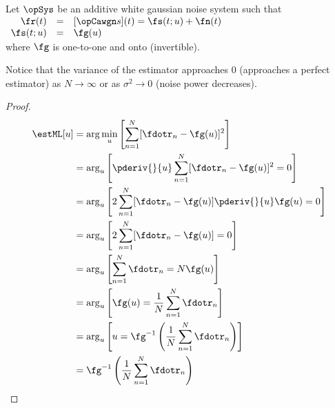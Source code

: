 {%
\begin{theorem}
\label{thm:estML-CR}
Let $\opSys$ be an additive white gaussian noise system
such that
$\begin{array}[t]{rcl}
   \fr(t)     &=& [\opCawgn s](t) = \fs(t;u) + \fn(t) \\
   \fs(t;u)   &=& \fg( u )
\end{array}$\\
where $\fg$ is one-to-one and onto (invertible).
\\
\end{theorem}

Notice that the variance of the estimator approaches $0$
(approaches a perfect estimator) as $N\to\infty$
or as $\sigma^2\to 0$ (noise power decreases).


\begin{proof}
\begin{align*}
   \estML[u]
     &= \arg\min_u
         \left[ \sum_{n=1}^N [\fdotr_n-\fg( u )]^2 \right]
   \\&= \arg_u\left[
            \pderiv{}{ u }\sum_{n=1}^N [\fdotr_n-\fg( u )]^2 = 0
         \right]
   \\&= \arg_u\left[
             2\sum_{n=1}^N [\fdotr_n-\fg( u )]\pderiv{}{ u }\fg( u ) = 0
         \right]
   \\&= \arg_u\left[
             2\sum_{n=1}^N [\fdotr_n-\fg( u )] = 0
         \right]
   \\&= \arg_u\left[
             \sum_{n=1}^N \fdotr_n = N \fg( u )
         \right]
   \\&= \arg_u\left[
             \fg( u ) = \frac{1}{N}\sum_{n=1}^N \fdotr_n
         \right]
   \\&= \arg_u\left[
              u  = \fg^{-1}\left(\frac{1}{N}\sum_{n=1}^N \fdotr_n\right)
         \right]
   \\&= \fg^{-1}\left(\frac{1}{N}\sum_{n=1}^N \fdotr_n\right)
\end{align*}



\end{proof}}
